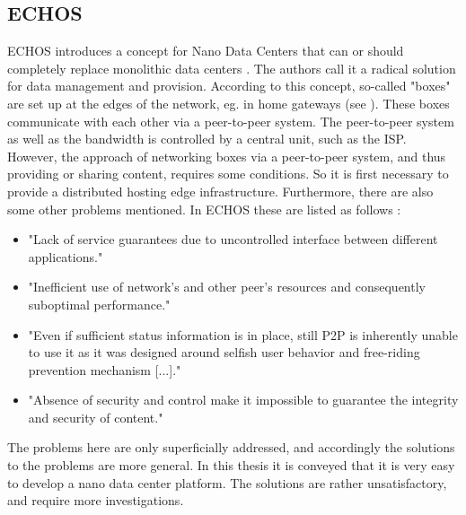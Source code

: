 \subsection{ECHOS}
ECHOS introduces a concept for Nano Data Centers that can or should completely replace monolithic data centers \cite{Laoutaris:2008:EEC:1341431.1341442}. The authors call it a radical solution for data management and provision.
According to this concept, so-called "boxes" are set up at the edges of the network, eg. in home gateways (see \cite{technicolor}). These boxes communicate with each other via a peer-to-peer system. The peer-to-peer system as well as the bandwidth is controlled by a central unit, such as the ISP. However, the approach of networking boxes via a peer-to-peer system, and thus providing or sharing content, requires some conditions. So it is first necessary to provide a distributed hosting edge infrastructure. Furthermore, there are also some other problems mentioned. In ECHOS these are listed as follows \cite{Laoutaris:2008:EEC:1341431.1341442}:
\begin{itemize}
	\item "Lack of service guarantees due to uncontrolled interface between different applications."
	\item "Inefficient use of network's and other peer's resources and consequently suboptimal performance."
	\item "Even if sufficient status information is in place, still P2P is inherently unable to use it as it was designed around selfish user behavior and free-riding prevention mechanism [...]."
	\item "Absence of security and control make it impossible to guarantee the integrity and security of content."
\end{itemize}
The problems here are only superficially addressed, and accordingly the solutions to the problems are more general. In this thesis it is conveyed that it is very easy to develop a nano data center platform. The solutions are rather unsatisfactory, and require more investigations.